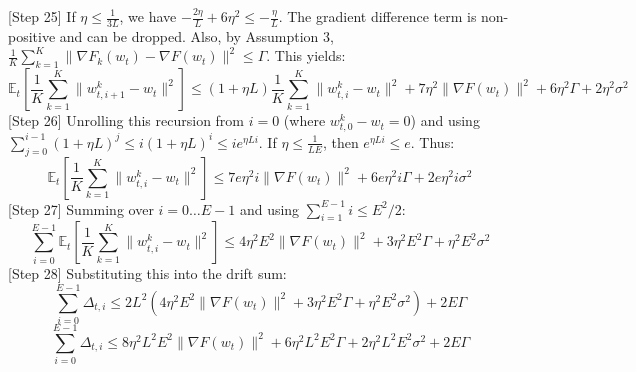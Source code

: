 \documentclass{article}
\begin{document}
[Step 25] If $\eta \leq \frac{1}{3L}$, we have $-\frac{2\eta}{L} + 6\eta^2 \leq -\frac{\eta}{L}$. The gradient difference term is non-positive and can be dropped. Also, by Assumption 3, $\frac{1}{K}\sum_{k=1}^K \|\nabla F_k(w_t) - \nabla F(w_t)\|^2 \leq \Gamma$. This yields:
$$ \mathbb{E}_t\left[ \frac{1}{K}\sum_{k=1}^K \|w_{t,i+1}^k - w_t\|^2 \right] \leq (1 + \eta L) \frac{1}{K}\sum_{k=1}^K \|w_{t,i}^k - w_t\|^2 + 7\eta^2 \|\nabla F(w_t)\|^2 + 6\eta^2 \Gamma + 2\eta^2 \sigma^2 $$
[Step 26] Unrolling this recursion from $i=0$ (where $w_{t,0}^k - w_t = 0$) and using $\sum_{j=0}^{i-1} (1+\eta L)^j \leq i(1+\eta L)^i \leq i e^{\eta L i}$. If $\eta \leq \frac{1}{LE}$, then $e^{\eta L i} \leq e$. Thus:
$$ \mathbb{E}_t\left[ \frac{1}{K}\sum_{k=1}^K \|w_{t,i}^k - w_t\|^2 \right] \leq 7e \eta^2 i \|\nabla F(w_t)\|^2 + 6e \eta^2 i \Gamma + 2e \eta^2 i \sigma^2 $$
[Step 27] Summing over $i=0 \dots E-1$ and using $\sum_{i=1}^{E-1} i \leq E^2/2$:
$$ \sum_{i=0}^{E-1} \mathbb{E}_t\left[ \frac{1}{K}\sum_{k=1}^K \|w_{t,i}^k - w_t\|^2 \right] \leq 4\eta^2 E^2 \|\nabla F(w_t)\|^2 + 3\eta^2 E^2 \Gamma + \eta^2 E^2 \sigma^2 $$
[Step 28] Substituting this into the drift sum:
$$ \sum_{i=0}^{E-1} \Delta_{t,i} \leq 2L^2 (4\eta^2 E^2 \|\nabla F(w_t)\|^2 + 3\eta^2 E^2 \Gamma + \eta^2 E^2 \sigma^2) + 2E\Gamma $$
$$ \sum_{i=0}^{E-1} \Delta_{t,i} \leq 8\eta^2 L^2 E^2 \|\nabla F(w_t)\|^2 + 6\eta^2 L^2 E^2 \Gamma + 2\eta^2 L^2 E^2 \sigma^2 + 2E\Gamma $$
\end{document}
